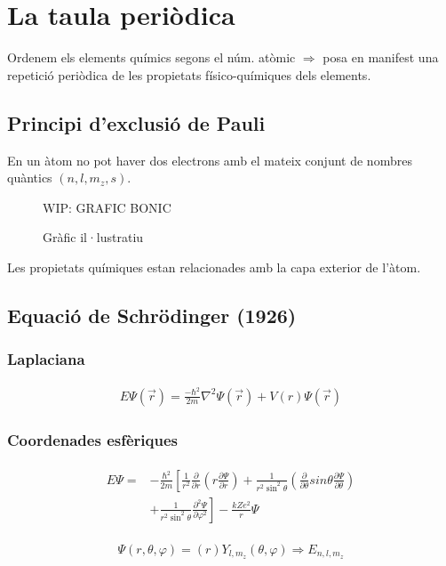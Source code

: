\section{La taula periòdica}
Ordenem els elements químics segons el núm. atòmic $\Rightarrow$ posa en manifest una repetició periòdica de les propietats físico-químiques dels elements.

\subsection{Principi d'exclusió de Pauli}
En un àtom no pot haver dos electrons amb el mateix conjunt de nombres quàntics $(n,l,m_{z},s)$.

\begin{figure}[H]
\centering
    WIP: GRAFIC BONIC 
\caption{Gràfic il·lustratiu}
\end{figure}

Les propietats químiques estan relacionades amb la capa exterior de l'àtom.

\subsection{Equació de Schrödinger (1926)}
\subsubsection*{Laplaciana}
\begin{align}
    E \Psi(\vec{r}) = \frac{-\hbar^2}{2m}\nabla^2 \Psi(\vec{r}) + V({r}) \Psi(\vec{r})
\end{align}
\subsubsection*{Coordenades esfèriques}
\begin{align}
\begin{aligned}
    E \Psi = & -\frac{\hbar^{2}}{2m} \left[ \frac{1}{r^{2}} \frac{\partial}{\partial r} \left( r \frac{\partial \Psi}{\partial r} \right) + \frac{1}{r^{2} \sin^{2} \theta} \left( \frac{\partial}{\partial \theta} sin \theta \frac{\partial \Psi}{\partial \theta} \right) \right. \\ 
    & + \left. \frac{1}{r^{2} \sin^{2} \theta} \frac{\partial^{2} \Psi}{\partial \varphi^{2}} \right] - \frac{kZe^{2}}{r} \Psi
\end{aligned}
\end{align}

\begin{align}
     \Psi({r,\theta,\varphi}) = ({r}) Y_{l,m_{z}}({\theta,\varphi})\Rightarrow E_{n,l,m_{z}}
\end{align}